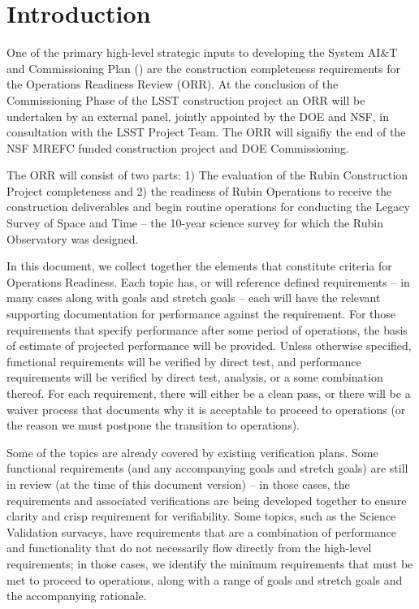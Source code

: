 
\section {Introduction}

One of the primary high-level strategic inputs to developing the System AI\&T and Commissioning Plan () are the construction completeness requirements for the Operations Readiness Review (ORR). At the conclusion of the Commissioning Phase of the LSST construction project an ORR will be undertaken by an external panel, jointly appointed by the DOE and NSF, in consultation with the LSST Project Team. The ORR will signifiy the end of the NSF MREFC funded construction project and DOE Commissioning.

The ORR will consist of two parts: 1) The evaluation of the Rubin Construction Project completeness and 2) the readiness of Rubin Operations to receive the construction deliverables and begin routine operations for conducting the Legacy Survey of Space and Time -- the 10-year science survey for which the Rubin Observatory was designed.

In this document, we collect together the elements that constitute criteria for Operations Readiness. Each topic has, or will reference defined requirements -- in many cases along with goals and stretch goals -- each will have the relevant supporting documentation for performance against the requirement. For those requirements that specify performance after some period of operations, the basis of estimate of projected performance will be provided. Unless otherwise specified, functional requirements will be verified by direct test, and performance requirements will be verified by direct test, analysis, or a some combination thereof.  For each requirement, there will either be a clean pass, or there will be a waiver process that documents why it is acceptable to proceed to operations (or the reason we must postpone the transition to operations).

Some of the topics are already covered by existing verification plans. Some functional requirements (and any accompanying goals and stretch goals) are still in review (at the time of this document version) -- in those cases, the requirements and associated verifications are being developed together to ensure clarity and crisp requirement for verifiability. Some topics, such as the Science Validation survaeys, have requirements that are a combination of performance and functionality that do not necessarily flow directly from the high-level requirements; in those cases, we identify the minimum requirements that must be met to proceed to operations, along with a range of goals and stretch goals and the accompanying rationale.